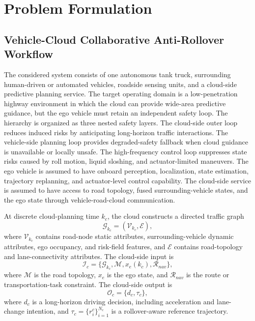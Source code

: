 \section{Problem Formulation}

\subsection{Vehicle-Cloud Collaborative Anti-Rollover Workflow}

The considered system consists of one autonomous tank truck, surrounding human-driven or automated vehicles, roadside sensing units, and a cloud-side predictive planning service. The target operating domain is a low-penetration highway environment in which the cloud can provide wide-area predictive guidance, but the ego vehicle must retain an independent safety loop. The hierarchy is organized as three nested safety layers. The cloud-side outer loop reduces induced risks by anticipating long-horizon traffic interactions. The vehicle-side planning loop provides degraded-safety fallback when cloud guidance is unavailable or locally unsafe. The high-frequency control loop suppresses state risks caused by roll motion, liquid sloshing, and actuator-limited maneuvers. The ego vehicle is assumed to have onboard perception, localization, state estimation, trajectory replanning, and actuator-level control capability. The cloud-side service is assumed to have access to road topology, fused surrounding-vehicle states, and the ego state through vehicle-road-cloud communication.

At discrete cloud-planning time $k_c$, the cloud constructs a directed traffic graph
\begin{equation}
  \mathcal{G}_{k_c}=(\mathcal{V}_{k_c},\mathcal{E}),
\end{equation}
where $\mathcal{V}_{k_c}$ contains road-node static attributes, surrounding-vehicle dynamic attributes, ego occupancy, and risk-field features, and $\mathcal{E}$ contains road-topology and lane-connectivity attributes. The cloud-side input is
\begin{equation}
  \mathcal{I}_c=\{\mathcal{G}_{k_c},\mathcal{M},x_e(k_c),\mathcal{R}_{nav}\},
\end{equation}
where $\mathcal{M}$ is the road topology, $x_e$ is the ego state, and $\mathcal{R}_{nav}$ is the route or transportation-task constraint. The cloud-side output is
\begin{equation}
  \mathcal{O}_c=\{d_c,\tau_c\},
\end{equation}
where $d_c$ is a long-horizon driving decision, including acceleration and lane-change intention, and $\tau_c=\{r_i^c\}_{i=1}^{N_c}$ is a rollover-aware reference trajectory.

